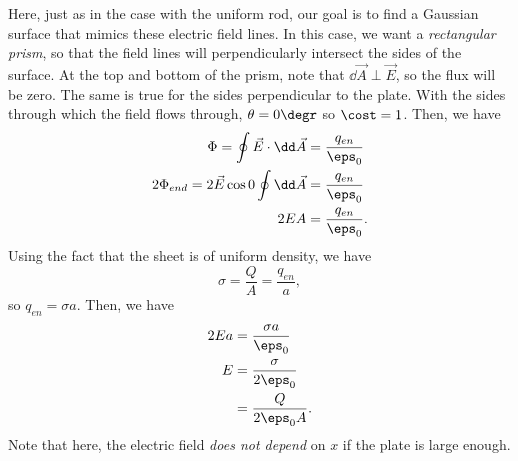 \documentclass[11pt]{article}
\begin{document}
Here, just as in the case with the uniform rod, our goal is to find a Gaussian surface that mimics these electric field lines. In this case, we want a \textit{rectangular prism}, so that the field lines will perpendicularly intersect the sides of the surface. At the top and bottom of the prism, note that $\dd\vec{A} \perp \vec{E}$, so the flux will be zero. The same is true for the sides perpendicular to the plate. With the sides through which the field flows through, $\theta = 0\degr$ so $\cost = 1$. Then, we have
\begin{align*}
	\Phi = \oint \vec{E}\cdot\dd \vec{A} &= \frac{q_{en}}{\eps_0} \\
	2\Phi_{end}	= 2\vec{E}\cos0\oint\dd \vec{A} &= \frac{q_{en}}{\eps_0} \\
	2EA &= \frac{q_{en}}{\eps_0}.
\end{align*}
Using the fact that the sheet is of uniform density, we have
\[\sigma = \frac{Q}{A} = \frac{q_{en}}{a},\]
so $q_{en} = \sigma a$. Then, we have
\begin{align*}
	2Ea &= \frac{\sigma a}{\eps_0} \\
	E &= \frac{\sigma}{2\eps_0} \\
	&= \frac{Q}{2\eps_0A}.
\end{align*}
Note that here, the electric field \textit{does not depend} on $x$ if the plate is large enough.
\end{document}

